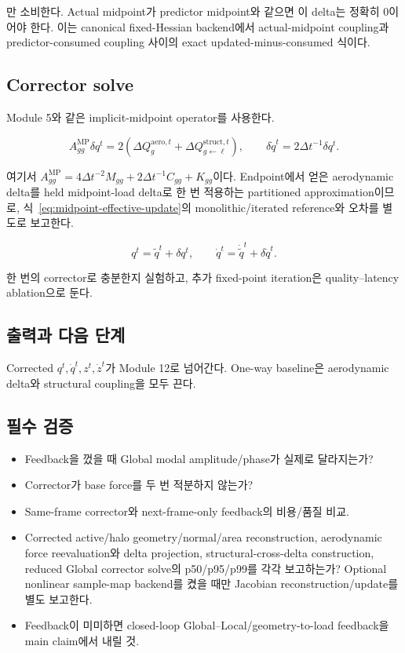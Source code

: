 \documentclass[11pt,a4paper]{article}
\begin{document}
만 소비한다. Actual midpoint가 predictor midpoint와 같으면 이 delta는 정확히 0이어야 한다.
이는 canonical fixed-Hessian backend에서 actual-midpoint coupling과
predictor-consumed coupling 사이의 exact updated-minus-consumed 식이다.

\subsection*{Corrector solve}

Module 5와 같은 implicit-midpoint operator를 사용한다.

\begin{equation}
  A_{gg}^{\mathrm{MP}}\delta q^t
  =
  2
  \left(
    \Delta Q_g^{\mathrm{aero},t}
    +\Delta Q_{g\leftarrow\ell}^{\mathrm{struct},t}
  \right),
  \qquad
  \delta\dot q^t=2\Delta t^{-1}\delta q^t.
  \label{eq:global-incremental-corrector}
\end{equation}

여기서
\(A_{gg}^{\mathrm{MP}}
=4\Delta t^{-2}M_{gg}+2\Delta t^{-1}C_{gg}+K_{gg}\)이다.
Endpoint에서 얻은 aerodynamic delta를 held midpoint-load delta로 한 번 적용하는
partitioned approximation이므로, 식~\eqref{eq:midpoint-effective-update}의 monolithic/iterated
reference와 오차를 별도로 보고한다.

\begin{equation}
  q^t=\widetilde q^t+\delta q^t,
  \qquad
  \dot q^t=\dot{\widetilde q}^t+\delta\dot q^t.
\end{equation}

한 번의 corrector로 충분한지 실험하고,
추가 fixed-point iteration은 quality--latency ablation으로 둔다.

\subsection*{출력과 다음 단계}

Corrected \(q^t,\dot q^t,z^t,\dot z^t\)가 Module 12로 넘어간다.
One-way baseline은 aerodynamic delta와 structural coupling을 모두 끈다.

\subsection*{필수 검증}

\begin{itemize}[leftmargin=1.5em]
  \item Feedback을 껐을 때 Global modal amplitude/phase가 실제로 달라지는가?
  \item Corrector가 base force를 두 번 적분하지 않는가?
  \item Same-frame corrector와 next-frame-only feedback의 비용/품질 비교.
  \item Corrected active/halo geometry/normal/area reconstruction,
  aerodynamic force reevaluation와 delta projection, structural-cross-delta construction,
  reduced Global corrector solve의 p50/p95/p99를 각각 보고하는가?
  Optional nonlinear sample-map backend를 켰을 때만 Jacobian reconstruction/update를 별도 보고한다.
  \item Feedback이 미미하면 closed-loop Global--Local/geometry-to-load feedback을 main claim에서 내릴 것.
\end{itemize}
\end{document}
